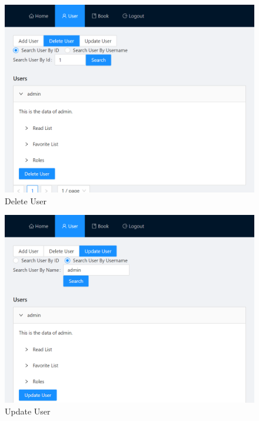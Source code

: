 \begin{minipage}{.49\textwidth}
  \begin{figure}[H]
    \centering
    \includegraphics[width=\linewidth]{img/front-end/user-delete.png}
    \caption{Delete User}
  \end{figure}
\end{minipage}
\begin{minipage}{.49\textwidth}
  \begin{figure}[H]
    \centering
    \includegraphics[width=\linewidth]{img/front-end/user-update.png}
    \caption{Update User}
  \end{figure}
\end{minipage}

